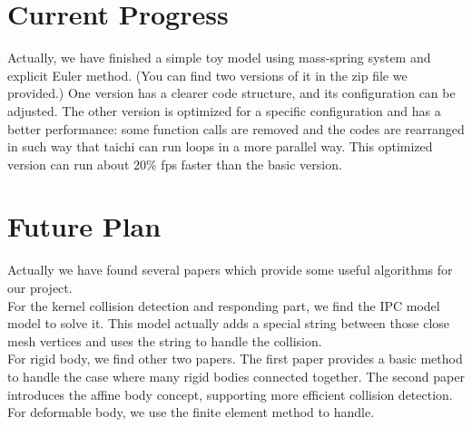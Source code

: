 \documentclass[SIGGRAPH]{acmart}
\begin{document}
\section{Current Progress}
Actually, we have finished a simple toy model using mass-spring system and explicit Euler method. (You can find two versions of it in the zip file we provided.) One version has a clearer code structure, and its configuration can be adjusted. The other version is optimized for a specific configuration and has a better performance: some function calls are removed and the codes are rearranged in such way that taichi can run loops in a more parallel way. This optimized version can run about $20\%$ fps faster than the basic version.

\section{Future Plan}
Actually we have found several papers which provide some useful algorithms for our project.\\
For the kernel collision detection and responding part, we find the  IPC model\cite{li2020incremental} model to solve it. This model actually adds a special string between those close mesh vertices and uses the string to handle the collision.\\
For rigid body, we find other two papers. The first paper\cite{liu2012quick} provides a basic method to handle the case where many rigid bodies connected together. The second paper\cite{lan2022affine} introduces the affine body concept, supporting more efficient collision detection.\\
For deformable body, we use the finite element method\cite{barbicsiggraph} to handle.




\end{document}
